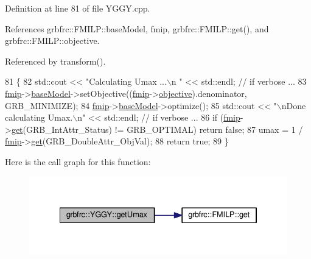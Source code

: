 Definition at line 81 of file Y\+G\+G\+Y.\+cpp.



References grbfrc\+::\+F\+M\+I\+L\+P\+::base\+Model, fmip, grbfrc\+::\+F\+M\+I\+L\+P\+::get(), and grbfrc\+::\+F\+M\+I\+L\+P\+::objective.



Referenced by transform().


\begin{DoxyCode}
81                                \{
82     std::cout << \textcolor{stringliteral}{"Calculating Umax ...\(\backslash\)n "} << std::endl;    \textcolor{comment}{// if verbose ...}
83     \hyperlink{classgrbfrc_1_1YGGY_aa4f63c22c95cd48cd87756ebc5de53aa}{fmip}->\hyperlink{classgrbfrc_1_1FMILP_a587e886dcaa1ece325a7f283100182a8}{baseModel}->setObjective((\hyperlink{classgrbfrc_1_1YGGY_aa4f63c22c95cd48cd87756ebc5de53aa}{fmip}->\hyperlink{classgrbfrc_1_1FMILP_a8807cc16614684fd6053b44dcd65657c}{objective}).denominator, GRB\_MINIMIZE);
84     \hyperlink{classgrbfrc_1_1YGGY_aa4f63c22c95cd48cd87756ebc5de53aa}{fmip}->\hyperlink{classgrbfrc_1_1FMILP_a587e886dcaa1ece325a7f283100182a8}{baseModel}->optimize();
85     std::cout << \textcolor{stringliteral}{"\(\backslash\)nDone calculating Umax.\(\backslash\)n"} << std::endl;       \textcolor{comment}{// if verbose ...}
86     \textcolor{keywordflow}{if} (\hyperlink{classgrbfrc_1_1YGGY_aa4f63c22c95cd48cd87756ebc5de53aa}{fmip}->\hyperlink{classgrbfrc_1_1FMILP_a5f74659534b60535f4cacce86ac94c23}{get}(GRB\_IntAttr\_Status) != GRB\_OPTIMAL) \textcolor{keywordflow}{return} \textcolor{keyword}{false};
87     umax = 1 / \hyperlink{classgrbfrc_1_1YGGY_aa4f63c22c95cd48cd87756ebc5de53aa}{fmip}->\hyperlink{classgrbfrc_1_1FMILP_a5f74659534b60535f4cacce86ac94c23}{get}(GRB\_DoubleAttr\_ObjVal);
88     \textcolor{keywordflow}{return} \textcolor{keyword}{true};
89 \}
\end{DoxyCode}


Here is the call graph for this function\+:
\nopagebreak
\begin{figure}[H]
\begin{center}
\leavevmode
\includegraphics[width=334pt]{classgrbfrc_1_1YGGY_afe0f69f05c5d01ec48f510918eda7c94_cgraph}
\end{center}
\end{figure}




